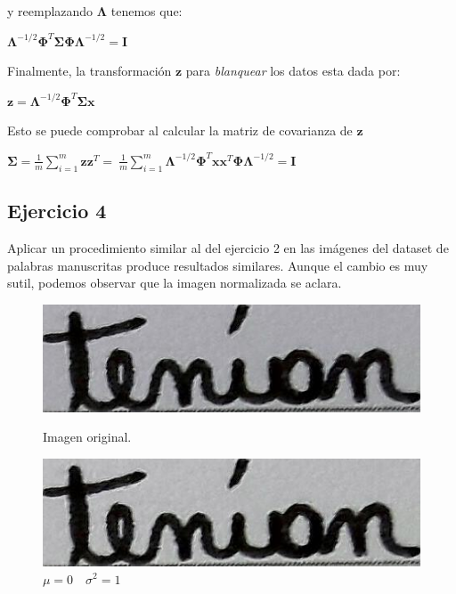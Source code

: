\documentclass[11pt,spanish]{article}
\begin{document}
y reemplazando $\mathbf{\Lambda}$ tenemos que:

\begin{center}
	\begin{math}
	\mathbf{\Lambda}^{-1/2} \mathbf{\Phi}^T \mathbf{\Sigma} \mathbf{\Phi} \mathbf{\Lambda}^{-1/2} = \mathbf{I}
	\end{math}
\end{center}

Finalmente, la transformación $\mathbf{z}$ para \textit{blanquear} los datos esta dada por:
\begin{center}
	\begin{math}
	\mathbf{z} = \mathbf{\Lambda}^{-1/2} \mathbf{\Phi}^T \mathbf{\Sigma} \mathbf{x}
	\end{math}
\end{center}

Esto se puede comprobar al calcular la matriz de covarianza de $\mathbf{z}$
\begin{center}
	\begin{math}
		\mathbf{\Sigma} = \frac{1}{m} \sum_{i=1}^{m} \mathbf{z} \mathbf{z}^T = \
		\frac{1}{m} \sum_{i=1}^{m} \mathbf{\Lambda}^{-1/2} \mathbf{\Phi}^T \mathbf{x} \mathbf{x}^T  \mathbf{\Phi} \mathbf{\Lambda}^{-1/2} = \mathbf{I}
	\end{math}
\end{center}

\subsection*{Ejercicio 4}
Aplicar un procedimiento similar al del ejercicio 2 en las imágenes del dataset de palabras manuscritas produce resultados similares. Aunque el cambio es muy sutil, podemos observar que la imagen normalizada se aclara.

\begin{figure}[htbp]
	\centering
	\begin{minipage}[b]{0.4\textwidth}
		\includegraphics[width=\textwidth]{../words_image.jpg}
		\caption{Imagen original.}
		\label{original_word}
	\end{minipage}
	\hfill
	\begin{minipage}[b]{0.4\textwidth}
		\includegraphics[width=\textwidth]{../words_quantized_image.jpg}
		\caption{$\mu=0 \quad \sigma^2=1$}
		\label{quantized_word}
	\end{minipage}
\end{figure}
\end{document}
